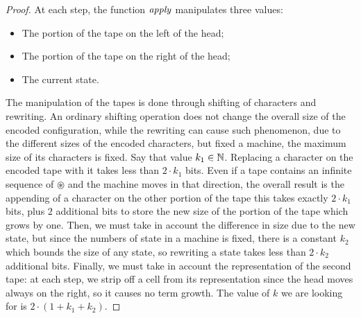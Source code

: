 \applysize*
\begin{proof}
  \label{proof:applysize}
  At each step, the function $\mathit{apply}$ manipulates three values:
  \begin{itemize}
    \item The portion of the tape on the left of the head;
    \item The portion of the tape on the right of the head;
    \item The current state.
  \end{itemize}
  The manipulation of the tapes is done through shifting of characters and
  rewriting. An ordinary shifting operation does not change
  the overall size of the encoded configuration, while the rewriting can cause such phenomenon,
  due to the different sizes of the encoded characters, but fixed a machine,
  the maximum size of its characters is fixed. Say that value $k_1 \in \mathbb{N}$.
  Replacing a character on the encoded tape with it takes less than $2\cdot k_1$ bits.
  Even if a tape contains an infinite sequence of $\circledast$ and the machine
  moves in that direction, the overall result is the appending of a character on
  the other portion of the tape this takes exactly $2\cdot k_1$ bits, plus
  $2$ additional bits to store the new size of the portion of the tape which
  grows by one.
  Then, we must take in account the difference in size due to the new state,
  but since the numbers of state in a machine is fixed, there is a constant $k_2$
  which bounds the size of any state, so rewriting a state takes less than
  $2\cdot k_2$ additional bits.
  Finally, we must take in account the representation of the second tape:
  at each step, we strip off a cell from its representation since the head
  moves always on the right, so it causes no term growth.
  The value of $k$ we are looking for is $2 \cdot(1+k_1+k_2)$.

\end{proof}


























































